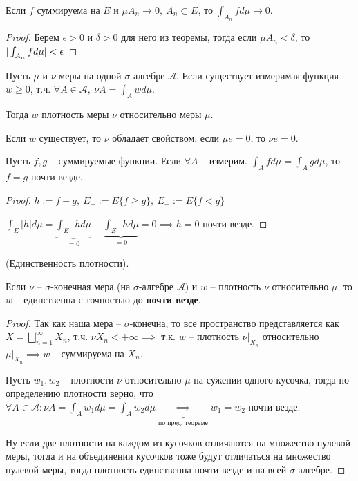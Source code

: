 \begin{consequence}
    Если $f$ суммируема на $E$ и $\mu A_n \rightarrow 0, \ A_n \subset E$, то $\int_{A_n} f d \mu \rightarrow 0$.
\end{consequence}
\begin{proof}
    Берем $\epsilon > 0$ и $\delta > 0$ для него из теоремы, тогда если $\mu A_n < \delta$, то $\\ |\int_{A_n} f d \mu| < \epsilon$
\end{proof}

\begin{definition}
    Пусть $\mu$ и $\nu$ меры на одной $\sigma$-алгебре $\mathcal{A}$. Если существует измеримая функция $w \geq 0$, т.ч. $\forall A \in \mathcal{A}, \ \nu A = \int_{A} w d \mu$.
    
    Тогда $w$ плотность меры $\nu$ относительно меры $\mu$.
\end{definition}

\begin{remark}
    Если $w$ существует, то $\nu$ обладает свойством: если $\mu e = 0$, то $\nu e = 0$.
\end{remark}

\begin{theorem}
    Пусть $f, g$ -- суммируемые функции. Если $\forall A$ -- измерим. $\int_A f d \mu = \int_A g d \mu$,
    то $f = g$ почти везде.
\end{theorem}
\begin{proof}
    $h := f - g, \ E_+ := E \{ f \geq g \}, \ E_- := E \{ f < g \}$

    $\int_E |h| d \mu = \underbrace{\int_{E_+} h d \mu}_{=0} - \underbrace{\int_{E_-} h d \mu}_{=0} = 0 \implies h = 0$ почти везде.
\end{proof}

\begin{theorem}
    (Единственность плотности).

    Если $\nu$ -- $\sigma$-конечная мера (на $\sigma$-алгебре $\mathcal{A}$) и $w$ -- плотность $\nu$ относительно $\mu$, то $w$ -- единственна с точностью до \textbf{почти везде}.
\end{theorem}
\begin{proof}
    Так как наша мера -- $\sigma$-конечна, то все пространство представляется как $X = \bigsqcup_{n=1}^{\infty}X_n$, т.ч. $\nu X_n < +\infty \implies $ т.к. $w$ -- плотность $\nu|_{X_n}$ относительно $\mu|_{X_n} \implies w$ -- суммируема на $X_n$.

    Пусть $w_1, w_2$ -- плотности $\nu$ относительно $\mu$ на сужении одного кусочка, тогда по определению плотности верно, что $\forall A \in \mathcal{A}: \nu A = \int_{A} {w_1 d \mu} = \int_{A} {w_2 d \mu} \underbrace{\implies}_{\text{по пред. теореме}} w_1 = w_2$ почти везде.
    
    Ну если две плотности на каждом из кусочков отличаются на множество нулевой меры, тогда и на объединении кусочков тоже будут отличаться на множество нулевой меры, тогда плотность единственна почти везде и на всей $\sigma$-алгебре.
\end{proof}

